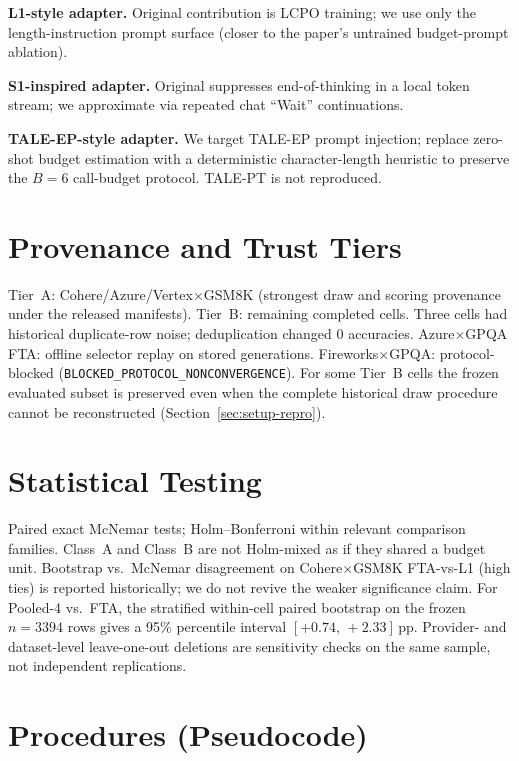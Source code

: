 \textbf{L1-style adapter.} Original contribution is LCPO training; we use only the
length-instruction prompt surface (closer to the paper's untrained budget-prompt ablation).

\textbf{S1-inspired adapter.} Original suppresses end-of-thinking in a local token stream; we
approximate via repeated chat ``Wait'' continuations.

\textbf{TALE-EP-style adapter.} We target TALE-EP prompt injection; replace zero-shot budget
estimation with a deterministic character-length heuristic to preserve the $B{=}6$ call-budget
protocol. TALE-PT is not reproduced.

\section{Provenance and Trust Tiers}
\label{app:provenance}

Tier~A: Cohere/Azure/Vertex$\times$GSM8K (strongest draw and scoring provenance under the released
manifests). Tier~B: remaining completed cells. Three cells had historical duplicate-row noise;
deduplication changed 0 accuracies. Azure$\times$GPQA FTA: offline selector replay on stored
generations. Fireworks$\times$GPQA: protocol-blocked (\texttt{BLOCKED\_PROTOCOL\_NONCONVERGENCE}).
For some Tier~B cells the frozen evaluated subset is preserved even when the complete historical
draw procedure cannot be reconstructed (Section~\ref{sec:setup-repro}).

\section{Statistical Testing}
\label{app:stats}

Paired exact McNemar tests; Holm--Bonferroni within relevant comparison families. Class~A and Class~B
are not Holm-mixed as if they shared a budget unit. Bootstrap vs.\ McNemar disagreement on
Cohere$\times$GSM8K FTA-vs-L1 (high ties) is reported historically; we do not revive the weaker
significance claim. For Pooled-4 vs.\ FTA, the stratified within-cell paired bootstrap on the frozen
$n{=}3394$ rows gives a 95\% percentile interval $[+0.74,\,+2.33]$\,pp. Provider- and dataset-level
leave-one-out deletions are sensitivity checks on the same sample, not independent replications.

\section{Procedures (Pseudocode)}
\label{app:frontier-pseudo}

